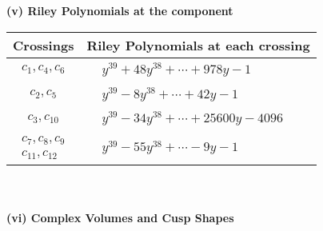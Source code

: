 \documentclass[1p]{elsarticle_modified}
\theoremstyle{definition}
\begin{document}
\newpage\renewcommand{\arraystretch}{1}
\flushleft \textbf{(v) Riley Polynomials at the component}\newline \\
\begin{tabular}{m{50pt}|m{274pt}}
Crossings & \hspace{64pt}Riley Polynomials at each crossing \\
\hline $$\begin{aligned}c_{1},c_{4},c_{6}\end{aligned}$$&$\begin{aligned}
&y^{39}+48 y^{38}+\cdots+978 y-1
\end{aligned}$\\
\hline $$\begin{aligned}c_{2},c_{5}\end{aligned}$$&$\begin{aligned}
&y^{39}-8 y^{38}+\cdots+42 y-1
\end{aligned}$\\
\hline $$\begin{aligned}c_{3},c_{10}\end{aligned}$$&$\begin{aligned}
&y^{39}-34 y^{38}+\cdots+25600 y-4096
\end{aligned}$\\
\hline $$\begin{aligned}c_{7},c_{8},c_{9}\\c_{11},c_{12}\end{aligned}$$&$\begin{aligned}
&y^{39}-55 y^{38}+\cdots-9 y-1
\end{aligned}$\\
\hline
\end{tabular}\\~\\
\newpage\flushleft \textbf{(vi) Complex Volumes and Cusp Shapes}
\end{document}
